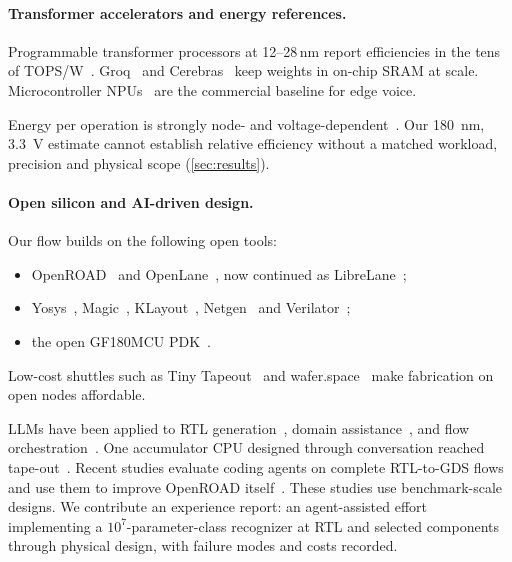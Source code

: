 \paragraph{Transformer accelerators and energy references.}
Programmable transformer processors at 12--28\,nm report efficiencies in the tens of TOPS/W~\cite{tu2022trancim,wang2022transformer28nm,tambe2023transformer12nm}. Groq~\cite{abts2020tsp} and Cerebras~\cite{lie2023cerebras} keep weights in on-chip SRAM at scale. Microcontroller NPUs~\cite{arm2024ethosu55,st2024stm32n6} are the commercial baseline for edge voice.

Energy per operation is strongly node- and voltage-dependent~\cite{horowitz2014energy,sze2017tutorial}. Our \SI{180}{nm}, \SI{3.3}{V} estimate cannot establish relative efficiency without a matched workload, precision and physical scope (\cref{sec:results}).

\paragraph{Open silicon and AI-driven design.}
Our flow builds on the following open tools:
\begin{itemize}
\item OpenROAD~\cite{ajayi2019openroad} and OpenLane~\cite{shalan2020openlane}, now continued as LibreLane~\cite{librelane};
\item Yosys~\cite{wolf_yosys}, Magic~\cite{edwards_magic}, KLayout~\cite{koefferlein_klayout}, Netgen~\cite{edwards_netgen} and Verilator~\cite{snyder_verilator};
\item the open GF180MCU PDK~\cite{google_gf180mcu}.
\end{itemize}
Low-cost shuttles such as Tiny Tapeout~\cite{venn2024tinytapeout} and wafer.space~\cite{waferspace} make fabrication on open nodes affordable.

LLMs have been applied to RTL generation~\cite{liu2023verilogeval,liu2024rtlcoder,chang2023chipgpt}, domain assistance~\cite{liu2023chipnemo}, and flow orchestration~\cite{he2024chateda,jiang2024iicpilot,wang2025mcp4eda,lu2025autoeda}. One accumulator CPU designed through conversation reached tape-out~\cite{blocklove2023chipchat}. Recent studies evaluate coding agents on complete RTL-to-GDS flows~\cite{deng2026rtl2gds} and use them to improve OpenROAD itself~\cite{ghose2026audopeda}. These studies use benchmark-scale designs. We contribute an experience report: an agent-assisted effort implementing a $10^7$-parameter-class recognizer at RTL and selected components through physical design, with failure modes and costs recorded.
